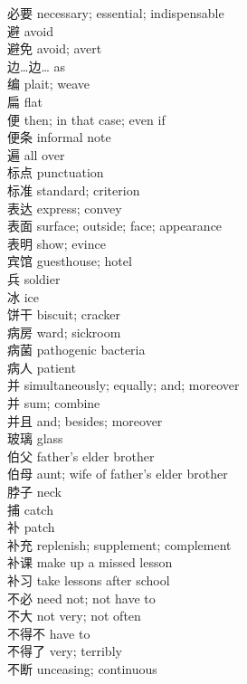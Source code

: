 必要 \quad necessary; essential; indispensable\\
避 \quad avoid\\
避免 \quad avoid; avert\\
边…边… \quad as\\
编 \quad plait; weave\\
扁 \quad flat\\
便 \quad then; in that case; even if\\
便条 \quad informal note\\
遍 \quad all over\\
标点 \quad punctuation\\
标准 \quad standard; criterion\\
表达 \quad express; convey\\
表面 \quad surface; outside; face; appearance\\
表明 \quad show; evince\\
宾馆 \quad guesthouse; hotel\\
兵 \quad soldier\\
冰 \quad ice\\
饼干 \quad biscuit; cracker\\
病房 \quad ward; sickroom\\
病菌 \quad pathogenic bacteria\\
病人 \quad patient\\
并 \quad simultaneously; equally; and; moreover\\
并 \quad sum; combine\\
并且 \quad and; besides; moreover\\
玻璃 \quad glass\\
伯父 \quad father's elder brother\\
伯母 \quad aunt; wife of father's elder brother\\
脖子 \quad neck\\
捕 \quad catch\\
补 \quad patch\\
补充 \quad replenish; supplement; complement\\
补课 \quad make up a missed lesson\\
补习 \quad take lessons after school\\
不必 \quad need not; not have to\\
不大 \quad not very; not often\\
不得不 \quad have to\\
不得了 \quad very; terribly\\
不断 \quad unceasing; continuous\\
